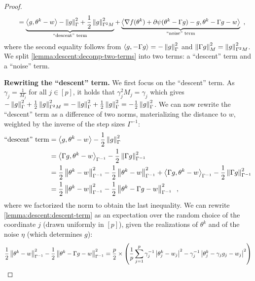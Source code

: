 \begin{proof}
\begin{align}
     & \qquad = \underbrace{\left\langle g, \theta^k- w \right\rangle
    - \left \lVert g \right \rVert^2_{\Gamma}
    + \frac{1}{2}\left \lVert g \right \rVert_{\Gamma^2M}^2}_{\text{``descent'' term}}
    + \underbrace{\left\langle \nabla f(\theta^k)
        + \partial \psi(\theta^k - \Gamma g) - g, \theta^k- \Gamma g - w \right\rangle}_{\text{``noise'' term}}\enspace,
    \label{lemma:descent:decomp-two-terms}
  \end{align}
  where the second equality follows from $\left\langle g, -\Gamma g \right\rangle = -\left \lVert g \right \rVert_{\Gamma}^2$
  and $\left \lVert \Gamma g \right \rVert_M^2 = \left \lVert g \right \rVert_{\Gamma^2M}^2$.
  We split \eqref{lemma:descent:decomp-two-terms} into two terms: a ``descent'' term and a ``noise'' term.

  \textbf{Rewriting the ``descent'' term.}
  We first focus on the ``descent'' term.
  As $\gamma_j = \frac{1}{M_j}$ for all $j \in [p]$, it holds that
  $\gamma_j^2 M_j = \gamma_j$ which gives $- \left \lVert g \right \rVert^2_{\Gamma} + \frac{1}{2}\left \lVert g \right \rVert_{\Gamma^2M}^2
    = - \left \lVert g \right \rVert^2_{\Gamma} + \frac{1}{2}\left \lVert g \right \rVert_{\Gamma}^2
    = - \frac{1}{2} \left \lVert g \right \rVert^2_{\Gamma}$.
  We can now rewrite the ``descent'' term as a difference of
  two norms, materializing the distance to $w$, weighted by the inverse of the
  step sizes $\Gamma^{-1}$:
  \begin{align}
    \text{``descent'' term}
     & = \left\langle g, \theta^k- w \right\rangle
    - \frac{1}{2} \left \lVert g \right \rVert^2_{\Gamma}                   \\
     & =
    \left\langle \Gamma g, \theta^k- w \right\rangle_{\Gamma^{-1}}
    - \frac{1}{2} \left \lVert \Gamma g \right \rVert^2_{\Gamma^{-1}}       \\
     & =
    \frac{1}{2}\left \lVert \theta^k - w \right \rVert_{\Gamma^{-1}}^2
    - \frac{1}{2}\left \lVert \theta^k - w \right \rVert_{\Gamma^{-1}}^2
    + \left\langle \Gamma g, \theta^k- w \right\rangle_{\Gamma^{-1}}
    - \frac{1}{2} \left \lVert \Gamma g \right \rVert^2_{\Gamma^{-1}}       \\
     & = \frac{1}{2}\left \lVert \theta^k - w \right \rVert_{\Gamma^{-1}}^2
    - \frac{1}{2}\left \lVert \theta^k - \Gamma g - w \right \rVert_{\Gamma^{-1}}^2\enspace,
    \label{lemma:descent:descent-term}
  \end{align}
  where we factorized the norm to obtain the last inequality.
  We can rewrite \eqref{lemma:descent:descent-term} as an expectation over the
  random choice of the coordinate $j$ (drawn uniformly in $[p]$), given the
  realizations of $\theta^k$ and of the noise $\eta$ (which determines $g$):
  \begin{align}
    \frac{1}{2} \norm{\theta^k - w}_{\Gamma^{-1}}^2 - \frac{1}{2} \norm{\theta^k - \Gamma g - w}_{\Gamma^{-1}}^2
     & = \frac{p}{2} \times \left( \frac{1}{p} \sum_{j=1}^p \gamma_j^{-1} \abs{\theta^k_j - w_j}^2 - \gamma_j^{-1} \abs{\theta_j^k - \gamma_j g_j - w_j}^2 \right) \\

\end{align}
\end{proof}
